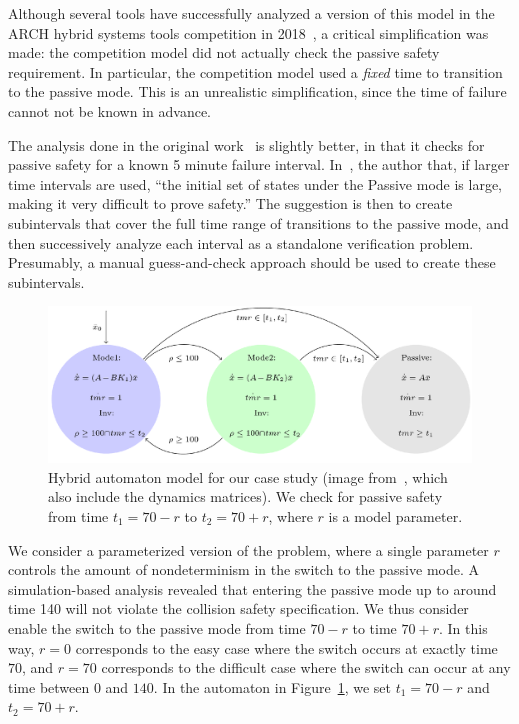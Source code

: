 Although several tools have successfully analyzed a version of this model in the ARCH hybrid systems tools competition in
2018~\cite{archcomp18linear}, a critical simplification was made: the competition model did not actually check the passive safety requirement.
%
In particular, the competition model used a \emph{fixed} time to transition to the passive mode.
%
This is an unrealistic simplification, since the time of failure cannot not be known in advance.


The analysis done in the original work~\cite{chan2017verifying} is slightly better, in that it checks for passive safety for a known 5 minute failure interval.
%
In~\cite{chan2017verifying}, the author that, if larger time intervals are used,
``the initial set of states under the Passive mode is large, making it very difficult to prove safety.''
%
The suggestion is then to create subintervals that cover the full time range of transitions to the passive mode, and then successively
analyze each interval as a standalone verification problem.
%
Presumably, a manual guess-and-check approach should be used to create these subintervals.

\begin{figure}[t]
\centerline{\includegraphics[width=0.9\columnwidth]{images/ha.png}}
\caption{Hybrid automaton model for our case study (image from~\cite{chan2017verifying}, which also include the dynamics matrices). We check for passive safety
  from time $t_1=70 - r$ to $t_2=70 + r$, where $r$ is a model parameter.}
\label{fig:ha}
\end{figure}

We consider a parameterized version of the problem, where a single parameter $r$ controls the amount of nondeterminism in the switch to the passive mode.
%
A simulation-based analysis revealed that entering the passive mode up to around time 140 will not violate the collision safety specification.
%
We thus consider enable the switch to the passive mode from time $70-r$ to time $70+r$.
%
In this way, $r=0$ corresponds to the easy case where the switch
occurs at exactly time $70$, and $r=70$ corresponds to the difficult case where the switch can occur at any time between $0$ and $140$.
%
In the automaton in Figure~\ref{fig:ha}, we set $t_1=70 - r$ and $t_2=70 + r$.

